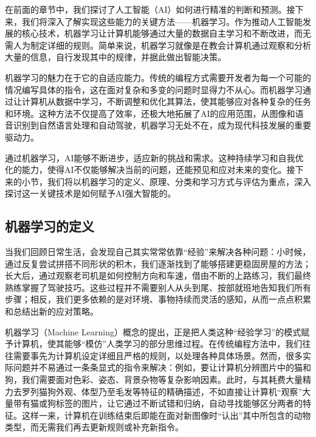 在前面的章节中，我们探讨了人工智能（AI）如何进行精准的判断和预测。接下来，我们将深入了解实现这些能力的关键方法——机器学习。作为推动人工智能发展的核心技术，机器学习让计算机能够通过大量的数据自主学习和不断改进，而无需人为制定详细的规则。简单来说，机器学习就像是在教会计算机通过观察和分析大量的信息，自行发现其中的规律，并据此做出智能决策。

机器学习的魅力在于它的自适应能力。传统的编程方式需要开发者为每一个可能的情况编写具体的指令，这在面对复杂和多变的问题时显得力不从心。而机器学习通过让计算机从数据中学习，不断调整和优化其算法，使其能够应对各种复杂的任务和环境。这种方法不仅提高了效率，还极大地拓展了AI的应用范围，从图像和语音识别到自然语言处理和自动驾驶，机器学习无处不在，成为现代科技发展的重要驱动力。

通过机器学习，AI能够不断进步，适应新的挑战和需求。这种持续学习和自我优化的能力，使得AI不仅能够解决当前的问题，还能预见和应对未来的变化。接下来的小节，我们将以机器学习的定义、原理、分类和学习方式与评估为重点，深入探讨这一关键技术是如何赋予AI强大智能的。

\subsection{机器学习的定义}

当我们回顾日常生活，会发现自己其实常常依靠“经验”来解决各种问题：小时候，通过反复尝试拼搭不同形状的积木，我们逐渐找到了能够搭建更稳固房屋的方法；长大后，通过观察老司机是如何控制方向和车速，借由不断的上路练习，我们最终熟练掌握了驾驶技巧。这些过程并不需要别人从头到尾、按部就班地告知我们所有步骤；相反，我们更多依赖的是对环境、事物持续而灵活的感知，从而一点点积累和总结出新的应对策略。

机器学习（Machine Learning）概念的提出，正是把人类这种“经验学习”的模式赋予计算机，使其能够“模仿”人类学习的部分思维过程。在传统编程方法中，我们往往需要事先为计算机设定详细且严格的规则，以处理各种具体场景。然而，很多实际问题并不易通过一条条显式的指令来解决：例如，要让计算机分辨图片中的猫和狗，我们需要面对色彩、姿态、背景杂物等复杂影响因素。此时，与其耗费大量精力去罗列猫狗外观、体型乃至毛发等特征的精确描述，不如直接让计算机“观察”大量带有猫或狗标签的图片，让它通过不断试错和归纳，自动寻找能够区分两者的特征。这样一来，计算机在训练结束后即能在面对新图像时“认出”其中所包含的动物类型，而无需我们再去更新规则或补充新指令。

